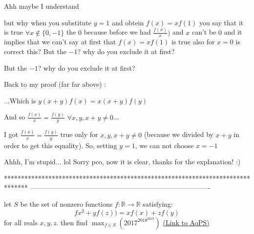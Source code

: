 \begin{solution}
	Ahh maybe I understand

but why when you substitute $y=1$ and obtein $f(x)=xf(1)$ you say that it is true $\forall x\notin\{0,-1\}$ the $0$ because before we had $\frac{f(x)}{x})$ and $x$ can't be $0$ and it implies that we can't say at first that $f(x)=xf(1)$
is true also for $x=0$ is correct this?
But the $-1$? why do you exclude it at first?
\end{solution}



\begin{solution}
	\begin{tcolorbox}But the $-1$? why do you exclude it at first?\end{tcolorbox}
Back to my proof (far far above) :
\begin{tcolorbox}...Which is $y(x+y)f(x)=x(x+y)f(y)$

And so $\frac{f(x)}x=\frac{f(y)}y$ $\forall x,y,x+y\ne 0$...\end{tcolorbox}
I got $\frac{f(x)}x=\frac{f(y)}y$ true only for $x,y,x+y\ne 0$ (because we divided by $x+y$ in order to get this equality).
So, setting $y=1$, we can not choose $x=-1$



\end{solution}



\begin{solution}
	Ahhh, I'm stupid... lol
Sorry pco, now it is clear, thanks for the explanation! :)
\end{solution}
*******************************************************************************
-------------------------------------------------------------------------------

\begin{problem}
	let $S$ be the set of nonzero  functions $f : \mathbb{R} \rightarrow \mathbb{R}$ satisfying:
$$fx^2+yf(z))=xf(x)+zf(y)$$ for all reals $x,y,z$.
  then  find $\max_{f \in S} (2017^{2018^{2019 }})$
	\flushright \href{https://artofproblemsolving.com/community/c6h1618752}{(Link to AoPS)}
\end{problem}




